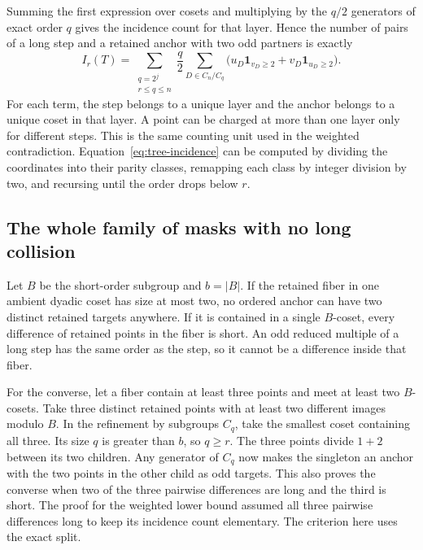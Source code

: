 \documentclass[12pt,letterpaper]{article}
\begin{document}
Summing the first expression over cosets and multiplying by the \(q/2\) generators of exact order \(q\) gives the incidence count for that layer. Hence the number of pairs of a long step and a retained anchor with two odd partners is exactly
\begin{equation}
 I_r(T)=\sum_{\substack{q=2^j\\r\le q\le n}}\frac q2
        \sum_{D\in C_n/C_q}
        \bigl(u_D\mathbf{1}_{v_D\ge 2}+v_D\mathbf{1}_{u_D\ge 2}\bigr).
 \label{eq:tree-incidence}
\end{equation}
For each term, the step belongs to a unique layer and the anchor belongs to a unique coset in that layer. A point can be charged at more than one layer only for different steps. This is the same counting unit used in the weighted contradiction. Equation~\eqref{eq:tree-incidence} can be computed by dividing the coordinates into their parity classes, remapping each class by integer division by two, and recursing until the order drops below \(r\).

\subsection{The whole family of masks with no long collision}

Let \(B\) be the short-order subgroup and \(b=|B|\). If the retained fiber in one ambient dyadic coset has size at most two, no ordered anchor can have two distinct retained targets anywhere. If it is contained in a single \(B\)-coset, every difference of retained points in the fiber is short. An odd reduced multiple of a long step has the same order as the step, so it cannot be a difference inside that fiber.

For the converse, let a fiber contain at least three points and meet at least two \(B\)-cosets. Take three distinct retained points with at least two different images modulo \(B\). In the refinement by subgroups \(C_q\), take the smallest coset containing all three. Its size \(q\) is greater than \(b\), so \(q\ge r\). The three points divide \(1+2\) between its two children. Any generator of \(C_q\) now makes the singleton an anchor with the two points in the other child as odd targets. This also proves the converse when two of the three pairwise differences are long and the third is short. The proof for the weighted lower bound assumed all three pairwise differences long to keep its incidence count elementary. The criterion here uses the exact split.
\end{document}
